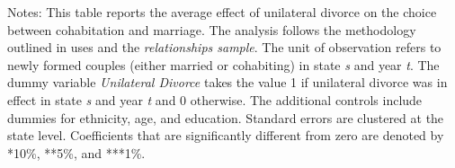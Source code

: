 \begin{table}[H]\centering                                  \scriptsize                                                                  \caption{The average effect of unilateral divorce on the choice between cohabitation and marriage among newly formed couples, by the presence of children}                                   \label{tab:tabrelch}                                 
\begin{minipage}{\textwidth}
\scriptsize\smallskip
Notes: This table reports the average effect of unilateral divorce on the choice between cohabitation and marriage. The analysis follows the methodology outlined in \cite{borusyak2021} uses and the \textit{relationships sample}. The unit of observation refers to newly formed couples (either married or cohabiting) in state \textit{s} and year \textit{t}. The dummy variable \textit{Unilateral Divorce} takes the value 1 if unilateral divorce was in effect in state \textit{s} and year \textit{t} and 0 otherwise. The additional controls include dummies for ethnicity, age, and education. Standard errors are clustered at the state level. Coefficients that are significantly different from zero are denoted by *10\%, **5\%, and ***1\%.
\\
\end{minipage}
\end{table}
